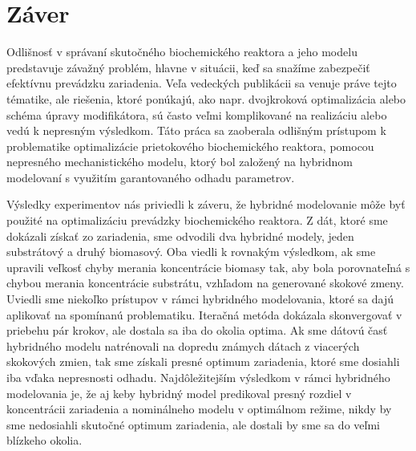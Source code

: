 \chapter{Záver}
Odlišnosť v správaní skutočného biochemického reaktora a jeho modelu predstavuje závažný problém, hlavne v situácii, keď sa snažíme zabezpečiť efektívnu prevádzku zariadenia. Veľa vedeckých publikácii sa venuje práve tejto tématike, ale riešenia, ktoré ponúkajú, ako napr. dvojkroková optimalizácia alebo schéma úpravy modifikátora, sú často veľmi komplikované na realizáciu alebo vedú k nepresným výsledkom. Táto práca sa zaoberala odlišným prístupom k problematike optimalizácie prietokového biochemického reaktora, pomocou nepresného mechanistického modelu, ktorý bol založený na hybridnom modelovaní s využitím garantovaného odhadu parametrov.

Výsledky experimentov nás priviedli k záveru, že hybridné modelovanie môže byť použité na optimalizáciu prevádzky biochemického reaktora. Z dát, ktoré sme dokázali získať zo zariadenia, sme odvodili dva hybridné modely, jeden substrátový a druhý biomasový. Oba viedli k rovnakým výsledkom, ak sme upravili veľkosť chyby merania koncentrácie biomasy tak, aby bola porovnateľná s chybou merania koncentrácie substrátu, vzhľadom na generované skokové zmeny. Uviedli sme niekoľko prístupov v rámci hybridného modelovania, ktoré sa dajú aplikovať na spomínanú problematiku. Iteračná metóda dokázala skonvergovať v priebehu pár krokov, ale dostala sa iba do okolia optima. Ak sme dátovú časť hybridného modelu natrénovali na dopredu známych dátach z viacerých skokových zmien, tak sme získali presné optimum zariadenia, ktoré sme dosiahli iba vďaka nepresnosti odhadu. Najdôležitejším výsledkom v rámci hybridného modelovania je, že aj keby hybridný model predikoval presný rozdiel v koncentrácii zariadenia a nominálneho modelu v optimálnom režime, nikdy by sme nedosiahli skutočné optimum zariadenia, ale dostali by sme sa do veľmi blízkeho okolia.

